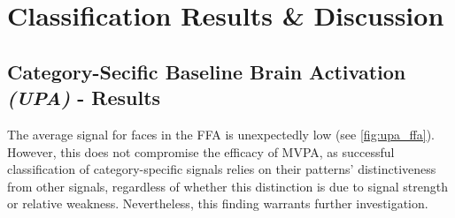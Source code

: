 \pagebreak
\chapter{Classification Results \& Discussion}
\label{sec:results}


\section{Category-Secific Baseline Brain Activation \textit{(UPA)} - Results}

The average signal for faces in the \gls{FFA} is unexpectedly low (see \autoref{fig:upa_ffa}). However, this does not compromise the efficacy of \gls{MVPA}, as successful classification of category-specific signals relies on their patterns' distinctiveness from other signals, regardless of whether this distinction is due to signal strength or relative weakness. Nevertheless, this finding warrants further investigation.

\vspace{2pt}

